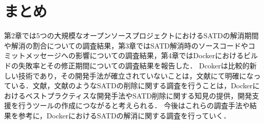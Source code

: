 \section{まとめ}
第2章では5つの大規模なオープンソースプロジェクトにおけるSATDの解消期間や解消の割合についての調査結果，第3章ではSATD解消時のソースコードやコミットメッセージへの影響についての調査結果，第4章ではDockerにおけるビルドの失敗率とその修正期間についての調査結果を報告した．
Dcokerは比較的新しい技術であり，その開発手法が確立されていないことは，文献\cite{docker-failures}にて明確になっている．文献\cite{satd-real-removal}，文献\cite{satd-real-removal}のようなSATDの削除に関する調査を行うことは，Dockerにおけるベストプラクティスな開発手法やSATD削除に関する知見の提供，開発支援を行うツールの作成につながると考えられる．
今後はこれらの調査手法や結果を参考に，DockerにおけるSATDの解消に関する調査を行っていく．
